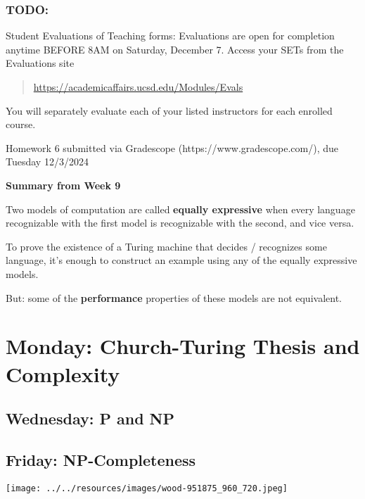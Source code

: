 \vspace{-20pt}

\subsubsection*{TODO:}
\begin{list}{\itemsep-10pt}
   \item Student Evaluations of Teaching forms: Evaluations are open for completion anytime BEFORE 8AM on Saturday, December 7.
    Access your SETs from the Evaluations site
    \begin{quote}
         \url{https://academicaffairs.ucsd.edu/Modules/Evals}
    \end{quote}
    You will separately evaluate each of your listed instructors for each enrolled course.
    \item Homework 6 submitted via Gradescope (https://www.gradescope.com/), due Tuesday 12/3/2024
\end{list}

\newpage


{\bf Summary from Week 9}

Two models of computation are called {\bf equally expressive} when 
every language recognizable with the first model is recognizable with the second, and vice versa.

To prove the existence of a Turing machine that decides / recognizes some language, 
it's enough to construct an example using any of the equally expressive models.

But: some of the {\bf performance} properties of these models are not equivalent.

\section*{Monday: Church-Turing Thesis and Complexity}


    
\newpage
\subsection*{Wednesday: P and NP}




\newpage
\subsection*{Friday: NP-Completeness}


\newpage


\begin{center}
\texttt{[image: ../../resources/images/wood-951875\_960\_720.jpeg]}
\end{center}


